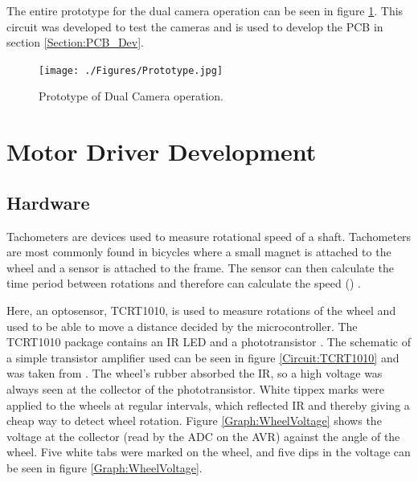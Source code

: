 The entire prototype for the dual camera operation can be seen in figure \ref{fig:Prototype}. This circuit was developed to test the cameras and is used to develop the PCB in section \ref{Section:PCB_Dev}. 
\begin{figure}
\texttt{[image: ./Figures/Prototype.jpg]}
\caption{Prototype of Dual Camera operation.}
\label{fig:Prototype}
\end{figure}
\section{Motor Driver Development}
\subsection{Hardware}
Tachometers are devices used to measure rotational speed of a shaft. Tachometers are most commonly found in bicycles where a small magnet is attached to the wheel and a sensor is attached to the frame. The sensor can then calculate the time period between rotations and therefore can calculate the speed (\citep{NEEDED}) .

Here, an optosensor, TCRT1010, is used to measure rotations of the wheel and used to be able to move a distance decided by the microcontroller. The TCRT1010 package contains an IR LED and a phototransistor \citep{Vishay:TCRT1010:Datasheet}. The schematic of a simple transistor amplifier used can be seen in figure \ref{Circuit:TCRT1010} and was taken from \cite{NEEDED}. 
The wheel's rubber absorbed the IR, so a high voltage was always seen at the collector of the phototransistor. White tippex marks were applied to the wheels at regular intervals, which reflected IR and thereby giving a cheap way to detect wheel rotation. Figure \ref{Graph:WheelVoltage} shows the voltage at the collector (read by the ADC on the AVR) against the angle of the wheel. Five white tabs were marked on the wheel, and five dips in the voltage can be seen in figure \ref{Graph:WheelVoltage}. 

